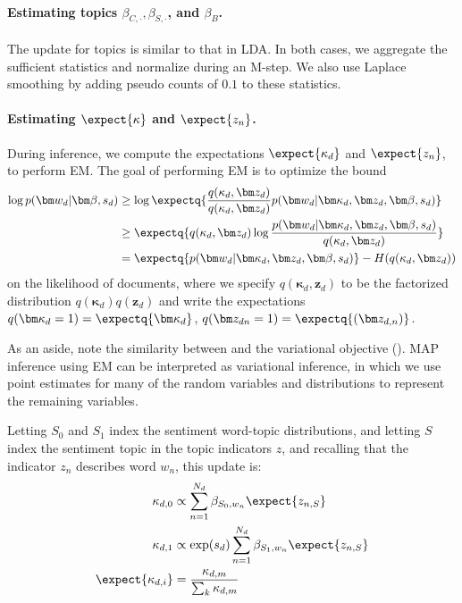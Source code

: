 \paragraph{Estimating topics $\beta_{C, \cdot}, \beta_{S, \cdot}$, and $\beta_{B}$.}
The update for topics is similar to that in LDA.  In both cases, we
aggregate the sufficient statistics and normalize during an M-step.
We also use Laplace smoothing by adding pseudo counts of
$0.1$ to these statistics.

\paragraph{Estimating $\expect{\kappa}$ and $\expect{z_n}$.}
During inference, we compute the expectations $\expect{\kappa_d}$ and
$\expect{z_n}$, to perform EM.  The goal of performing EM is to optimize the bound
\begin{align}
  \log p(\bm w_d | \bm \beta, s_d)
  & \ge \log \expectq{ \frac{q(\kappa_d, \bm z_d)}{q(\kappa_d, \bm z_d)} p(\bm w_d | \bm \kappa_d, \bm z_d, \bm \beta, s_d) } \\
  & \ge \expectq{ q(\kappa_d, \bm z_d) \log \frac{p(\bm w_d | \bm
      \kappa_d, \bm z_d, \bm \beta, s_d)}{q(\kappa_d, \bm z_d)} } \\
  & = \expectq{ p(\bm w_d | \bm \kappa_d, \bm z_d, \bm \beta, s_d)}
  - H(q(\kappa_d, \bm z_d))
\label{eq:fr_em_motivation}
\end{align}
on the likelihood of documents, where we specify $q(\bm \kappa_d, \bm
z_d)$ to be the factorized distribution $q(\bm \kappa_d) q(\bm z_d)$
and write the expectations $q(\bm \kappa_{d} = 1) = \expectq{\bm
  \kappa_d}$, $q(\bm z_{dn}=1) = \expectq{(\bm z_{d,n})}$.

As an aside, note the similarity between  and
the variational objective ().
MAP inference using EM can be interpreted as variational inference, in
which we use point estimates for many of the random variables and
distributions to represent the remaining variables.

Letting $S_0$ and $S_1$ index the sentiment word-topic distributions,
and letting $S$ index the sentiment topic in the topic indicators $z$,
and recalling that the indicator $z_n$ describes word $w_n$, this
update is:
\begin{align}
  \kappa_{d,0} & \propto \sum_{n=1}^{N_d} \beta_{S_0,w_n} \expect{z_{n,S}} \nonumber \\
  \kappa_{d,1} & \propto \exp(s_d) \sum_{n=1}^{N_d} \beta_{S_1,w_n} \expect{z_{n,S}} \nonumber \\
  \expect{\kappa_{d,i}} & = \frac{\kappa_{d,m}} { \sum_k \kappa_{d,m} } \nonumber \\
\end{align}

